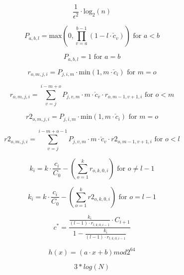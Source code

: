 \documentclass{article}
\begin{document}
\[\frac{1}{\epsilon^2}\cdot \mbox{log}_2(n)\]
\pagebreak

\[P_{a,b,l}=\mbox{max}(0, \prod_{v=a}^{b-1}(1-l\cdot \check{c}_v)) \mbox{ for } a<b\]
\pagebreak

\[P_{a,b,l}=1 \mbox{ for } a=b\]
\pagebreak

\[r_{o,m,j,i}=P_{j,i,m}\cdot\mbox{min}(1,m\cdot\check{c}_i) \mbox{ for } m=o\]
\pagebreak

\[r_{o,m,j,i}=\sum_{v=j}^{i-m+o}P_{j,v,m}\cdot m\cdot\check{c}_v\cdot r_{o,m-1,v+1,i} \mbox{ for } o<m\]
\pagebreak

\[r2_{o,m,j,i}=P_{j,i,m}\cdot\mbox{min}(1,m\cdot\check{c}_i) \mbox{ for } m=o\]
\pagebreak

\[r2_{o,m,j,i}=\sum_{v=j}^{i-m+o-1}P_{j,v,m}\cdot m\cdot\check{c}_v\cdot r2_{o,m-1,v+1,i} \mbox{ for } o<l\]
\pagebreak

\[k_i = k\cdot\frac{c_i}{C_0}-(\sum_{o=1}^{k}r_{o,k,0,i}) \mbox{ for } o\neq l-1\]
\pagebreak

\[k_i = k\cdot\frac{c_i}{C_0}-(\sum_{o=1}^{k}r2_{o,k,0,i}) \mbox{ for } o=l-1\]
\pagebreak

\[c^* = \frac{\frac{k_i}{(l-1)\cdot r_{l,k,0,i-1}}\cdot C_{i+1}}{1-\frac{k_i}{(l-1)\cdot r_{l,k,0,i-1}}}\]
\pagebreak

\[h(x) = (a\cdot x + b) mod 2^{64}\]
\pagebreak

\[3*log(N)\]
\pagebreak
\end{document}
